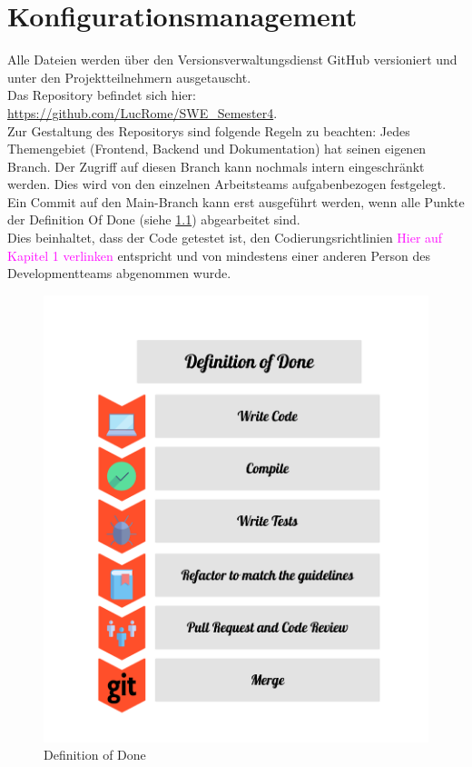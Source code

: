 
\chapter{Konfigurationsmanagement}
Alle Dateien werden über den Versionsverwaltungsdienst GitHub versioniert und unter den Projektteilnehmern ausgetauscht.\\
Das Repository befindet sich hier: \url{https://github.com/LucRome/SWE_Semester4}.\\

Zur Gestaltung des Repositorys sind folgende Regeln zu beachten:
Jedes Themengebiet (Frontend, Backend und Dokumentation) hat seinen eigenen Branch.
Der Zugriff auf diesen Branch kann nochmals intern eingeschränkt werden. Dies wird von den einzelnen Arbeitsteams aufgabenbezogen festgelegt. \\
Ein Commit auf den Main-Branch kann erst ausgeführt werden, wenn alle Punkte der Definition Of Done (siehe \ref{fib:DOD}) abgearbeitet sind. \\
Dies beinhaltet, dass der Code getestet ist, den Codierungsrichtlinien \textcolor{magenta}{Hier auf Kapitel 1 verlinken} entspricht und von mindestens einer anderen Person des Developmentteams abgenommen wurde. \\

\begin{figure}[H]
\centering
\includegraphics[height=.8\textwidth]{definition_of_done.png}
\caption{Definition of Done}
\label{fib:DOD}
\end{figure}

